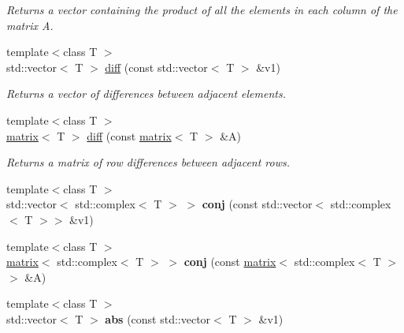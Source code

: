 \begin{DoxyCompactItemize}
\begin{DoxyCompactList}\small\item\em Returns a vector containing the product of all the elements in each column of the matrix A. \end{DoxyCompactList}\item 
\hypertarget{namespacekeycpp_ae67644e3e1031773d6bfdb1ebb7d88e2}{{\footnotesize template$<$class T $>$ }\\std\-::vector$<$ T $>$ \hyperlink{namespacekeycpp_ae67644e3e1031773d6bfdb1ebb7d88e2}{diff} (const std\-::vector$<$ T $>$ \&v1)}\label{namespacekeycpp_ae67644e3e1031773d6bfdb1ebb7d88e2}

\begin{DoxyCompactList}\small\item\em Returns a vector of differences between adjacent elements. \end{DoxyCompactList}\item 
{\footnotesize template$<$class T $>$ }\\\hyperlink{classkeycpp_1_1matrix}{matrix}$<$ T $>$ \hyperlink{namespacekeycpp_abb4e57814fd30b7b8d4845bbc16c73e9}{diff} (const \hyperlink{classkeycpp_1_1matrix}{matrix}$<$ T $>$ \&A)
\begin{DoxyCompactList}\small\item\em Returns a matrix of row differences between adjacent rows. \end{DoxyCompactList}\item 
\hypertarget{namespacekeycpp_a4c2e92e1abe266ccc6735d443c228a97}{{\footnotesize template$<$class T $>$ }\\std\-::vector$<$ std\-::complex$<$ T $>$ $>$ {\bfseries conj} (const std\-::vector$<$ std\-::complex$<$ T $>$$>$ \&v1)}\label{namespacekeycpp_a4c2e92e1abe266ccc6735d443c228a97}

\item 
\hypertarget{namespacekeycpp_a0f000b392fbefccdb089383bb6a20151}{{\footnotesize template$<$class T $>$ }\\\hyperlink{classkeycpp_1_1matrix}{matrix}$<$ std\-::complex$<$ T $>$ $>$ {\bfseries conj} (const \hyperlink{classkeycpp_1_1matrix}{matrix}$<$ std\-::complex$<$ T $>$$>$ \&A)}\label{namespacekeycpp_a0f000b392fbefccdb089383bb6a20151}

\item 
\hypertarget{namespacekeycpp_ab02a8494963dd9566a978221434d9366}{{\footnotesize template$<$class T $>$ }\\std\-::vector$<$ T $>$ {\bfseries abs} (const std\-::vector$<$ T $>$ \&v1)}\label{namespacekeycpp_ab02a8494963dd9566a978221434d9366}


\end{DoxyCompactItemize}
